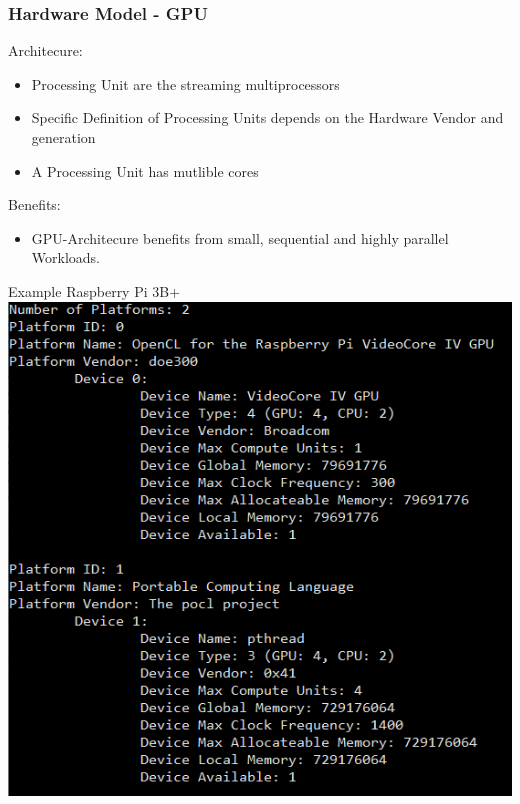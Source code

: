 \documentclass{beamer}
\begin{document}
\begin{frame}
    \frametitle{Hardware Model - GPU}
    Architecure:
    \begin{itemize}
     \item Processing Unit are the streaming multiprocessors
     \item Specific Definition of Processing Units depends on the Hardware Vendor and generation
     \item A Processing Unit has mutlible cores
    \end{itemize}
    Benefits:
    \begin{itemize}
     \item GPU-Architecure benefits from small, sequential and highly parallel Workloads.
    \end{itemize}
\end{frame}

\begin{frame}{Example Raspberry Pi 3B+}
    \includegraphics[height=.8\textheight]{res/RaspberryPiData.PNG}
\end{frame}
\end{document}
